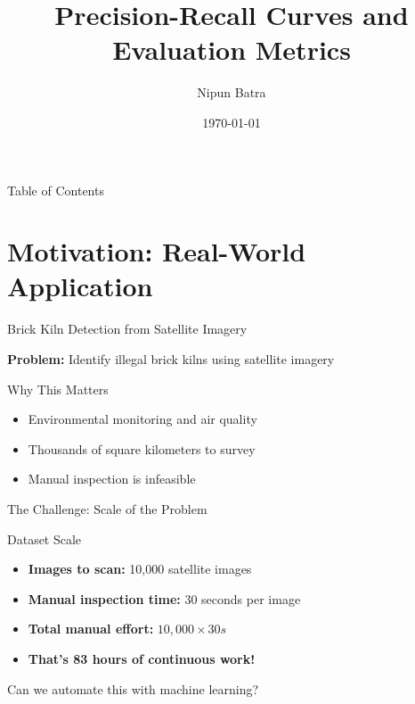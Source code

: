 \documentclass{beamer}
\title{Precision-Recall Curves and Evaluation Metrics}
\date{\today}
\author{Nipun Batra}
\institute{IIT Gandhinagar}
\begin{document}
\maketitle

\begin{frame}{Table of Contents}
\tableofcontents
\end{frame}

\section{Motivation: Real-World Application}

\begin{frame}{Brick Kiln Detection from Satellite Imagery}
\begin{center}
\textbf{Problem:} Identify illegal brick kilns using satellite imagery
\end{center}

\vspace{0.3cm}

\begin{keypointsbox}{Why This Matters}
\begin{itemize}
    \item Environmental monitoring and air quality
    \item Thousands of square kilometers to survey
    \item Manual inspection is infeasible
\end{itemize}
\end{keypointsbox}
\end{frame}

\begin{frame}{The Challenge: Scale of the Problem}
\begin{block}{Dataset Scale}
\begin{itemize}
    \item \textbf{Images to scan:} 10,000 satellite images
    \item \textbf{Manual inspection time:} 30 seconds per image
    \item \textbf{Total manual effort:} $10{,}000 \times 30s$
    \item \textbf{That's 83 hours of continuous work!}
\end{itemize}
\end{block}

\vspace{0.5cm}

\begin{center}
\Large
Can we automate this with machine learning?
\end{center}
\end{frame}
\end{document}
